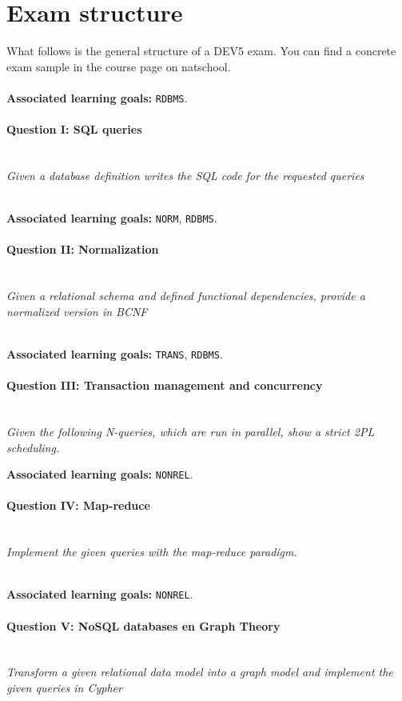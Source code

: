\section*{Exam structure}
What follows is the general structure of a DEV5 exam. You can find a concrete exam sample in the course page on natschool.
\\ 
\\
\textbf{Associated learning goals:} \texttt{RDBMS}.
\paragraph{Question I: SQL queries} \ \\

\textit{Given a database definition writes the SQL code for the requested queries} 


\ \\ 
\textbf{Associated learning goals:} \texttt{NORM}, \texttt{RDBMS}.
\paragraph{Question II: Normalization} \ \\ 

\textit{Given a relational schema and defined functional dependencies, provide a normalized version in BCNF}

\ \\ 

\textbf{Associated learning goals:} \texttt{TRANS}, \texttt{RDBMS}.
\paragraph{Question III: Transaction management and concurrency}

\ \\ 

\textit{Given the following N-queries, which are run in parallel, show a strict 2PL scheduling. }


\textbf{Associated learning goals:} \texttt{NONREL}.
\paragraph{Question IV: Map-reduce}

\ \\ 

\textit{Implement the given queries with the map-reduce paradigm.}

\ \\ 
\textbf{Associated learning goals:} \texttt{NONREL}.
\paragraph{Question V: NoSQL databases en Graph Theory}

\ \\ 

\textit{Transform a given relational data model into a graph model and implement the given queries in Cypher}